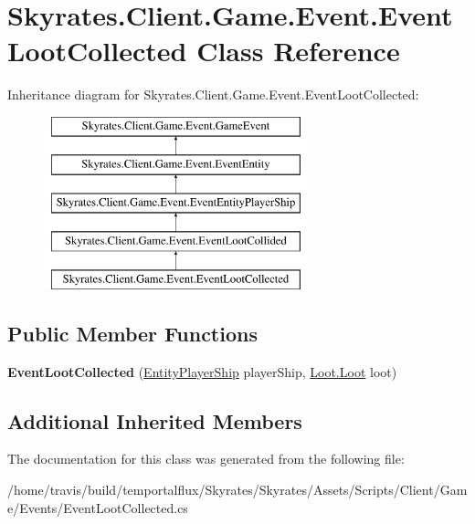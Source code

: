 \hypertarget{class_skyrates_1_1_client_1_1_game_1_1_event_1_1_event_loot_collected}{\section{Skyrates.\-Client.\-Game.\-Event.\-Event\-Loot\-Collected Class Reference}
\label{class_skyrates_1_1_client_1_1_game_1_1_event_1_1_event_loot_collected}
}
Inheritance diagram for Skyrates.\-Client.\-Game.\-Event.\-Event\-Loot\-Collected\-:\begin{figure}[H]
\begin{center}
\leavevmode
\includegraphics[height=5.000000cm]{class_skyrates_1_1_client_1_1_game_1_1_event_1_1_event_loot_collected}
\end{center}
\end{figure}
\subsection*{Public Member Functions}
\begin{DoxyCompactItemize}
\item 
\hypertarget{class_skyrates_1_1_client_1_1_game_1_1_event_1_1_event_loot_collected_a57811ed7da0562397ff808b1d7e7d798}{{\bfseries Event\-Loot\-Collected} (\hyperlink{class_skyrates_1_1_client_1_1_entity_1_1_entity_player_ship}{Entity\-Player\-Ship} player\-Ship, \hyperlink{class_skyrates_1_1_client_1_1_loot_1_1_loot}{Loot.\-Loot} loot)}\label{class_skyrates_1_1_client_1_1_game_1_1_event_1_1_event_loot_collected_a57811ed7da0562397ff808b1d7e7d798}

\end{DoxyCompactItemize}
\subsection*{Additional Inherited Members}


The documentation for this class was generated from the following file\-:\begin{DoxyCompactItemize}
\item 
/home/travis/build/temportalflux/\-Skyrates/\-Skyrates/\-Assets/\-Scripts/\-Client/\-Game/\-Events/Event\-Loot\-Collected.\-cs\end{DoxyCompactItemize}

